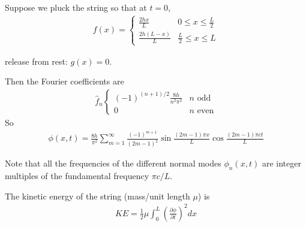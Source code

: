 \documentclass[a4paper]{article}
\begin{document}
\begin{eg}
Suppose we pluck the string so that at $t=0$,
\begin{equation*}
\begin{aligned}
f\left(x\right) = \left\{\begin{array}{ll}
\frac{2hx}{L} & 0\leq x \leq \frac{L}{2}\\
\frac{2h\left(L-x\right)}{L} & \frac{L}{2} \leq x \leq L
\end{array}
\right.
\end{aligned}
\end{equation*}


release from rest: $g\left(x\right) = 0$.

Then the Fourier coefficients are
\begin{equation*}
\begin{aligned}
\hat{f}_n \left\{ \begin{array}{ll}
\left(-1\right)^{\left(n+1\right)/2} \frac{8h}{n^2 \pi^2} & n \text{ odd}\\
0 & n \text{ even}
\end{array}
\right.
\end{aligned}
\end{equation*}
So
\begin{equation*}
\begin{aligned}
\phi\left(x,t\right) = \frac{8h}{\pi^2} \sum_{m=1}^\infty \frac{\left(-1\right)^{m+1}}{\left(2m-1\right)^2} \sin\frac{\left(2m-1\right)\pi x}{L} \cos\frac{\left(2m-1\right) \pi c t}{L}
\end{aligned}
\end{equation*}

Note that all the frequencies of the different normal modes $\phi_n\left(x,t\right)$ are integer multiples of the fundamental frequency $\pi c/L$.

The kinetic energy of the string (mass/unit length $\mu$) is
\begin{equation*}
\begin{aligned}
KE = \frac{1}{2}\mu \int_0^L \left(\frac{\partial \phi}{\partial t}\right)^2 dx
\end{aligned}
\end{equation*}


\end{eg}
\end{document}
